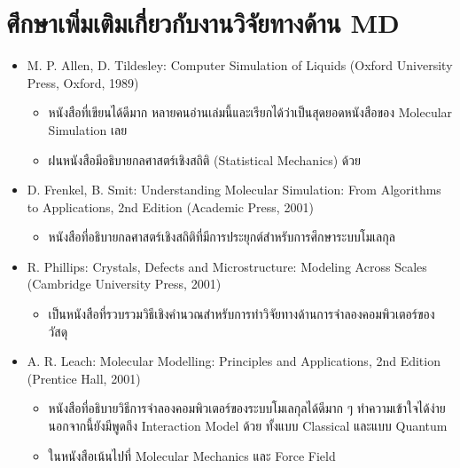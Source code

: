 \section{ศึกษาเพิ่มเติมเกี่ยวกับงานวิจัยทางด้าน MD}

\begin{itemize}[topsep=0pt,noitemsep]
  \setlength\itemsep{0.5em}
  \item M. P. Allen, D. Tildesley: Computer Simulation of Liquids (Oxford University Press, Oxford, 1989)
        \begin{itemize}[noitemsep]
          \setlength\itemsep{0.5em}
          \item หนังสือที่เขียนได้ดีมาก หลายคนอ่านเล่มนี้และเรียกได้ว่าเป็นสุดยอดหนังสือของ Molecular Simulation เลย

          \item ฝนหนังสือมีอธิบายกลศาสตร์เชิงสถิติ (Statistical Mechanics) ด้วย
        \end{itemize}

  \item D. Frenkel, B. Smit: Understanding Molecular Simulation: From Algorithms to Applications, 2nd Edition
        (Academic Press, 2001)
        \begin{itemize}[noitemsep]
          \setlength\itemsep{0.5em}
          \item หนังสือที่อธิบายกลศาสตร์เชิงสถิติที่มีการประยุกต์สำหรับการศึกษาระบบโมเลกุล
        \end{itemize}

  \item R. Phillips: Crystals, Defects and Microstructure: Modeling Across Scales (Cambridge University Press,
        2001)
        \begin{itemize}[noitemsep]
          \setlength\itemsep{0.5em}
          \item เป็นหนังสือที่รวบรวมวิธีเชิงคำนวณสำหรับการทำวิจัยทางด้านการจำลองคอมพิวเตอร์ของวัสดุ
        \end{itemize}

  \item A. R. Leach: Molecular Modelling: Principles and Applications, 2nd Edition (Prentice Hall, 2001)
        \begin{itemize}[noitemsep]
          \setlength\itemsep{0.5em}
          \item หนังสือที่อธิบายวิธีการจำลองคอมพิวเตอร์ของระบบโมเลกุลได้ดีมาก ๆ ทำความเข้าใจได้ง่าย นอกจากนี้ยังมีพูดถึง Interaction Model ด้วย ทั้งแบบ Classical และแบบ Quantum

          \item ในหนังสือเน้นไปที่ Molecular Mechanics และ Force Field
        \end{itemize}

\end{itemize}

